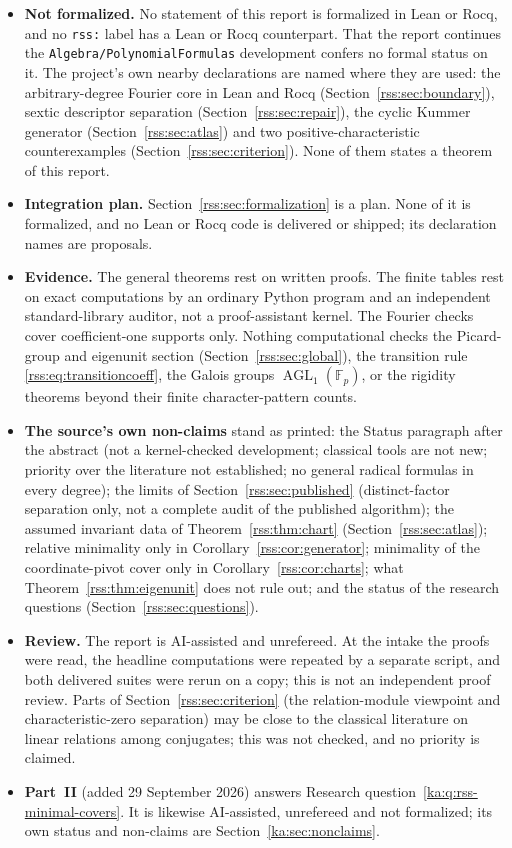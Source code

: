 \documentclass[11pt,a4paper]{article}
\theoremstyle{definition}
\theoremstyle{remark}
\newcommand{\F}{\mathbb F}
\newcommand{\AGL}{\operatorname{AGL}}
\newcommand{\code}[1]{{\small\nolinkurl{#1}}}
\begin{document}
\begin{itemize}
\item \textbf{Not formalized.} No statement of this report is formalized in
Lean or Rocq, and no \code{rss:} label has a Lean or Rocq counterpart. That
the report continues the \code{Algebra/PolynomialFormulas} development
confers no formal status on it. The project's own nearby declarations are named where they are used:
the arbitrary-degree Fourier core in Lean and Rocq (Section~\ref{rss:sec:boundary}),
sextic descriptor separation (Section~\ref{rss:sec:repair}), the cyclic Kummer
generator (Section~\ref{rss:sec:atlas}) and two positive-characteristic
counterexamples (Section~\ref{rss:sec:criterion}). None of them states a
theorem of this report.
\item \textbf{Integration plan.} Section~\ref{rss:sec:formalization} is a
plan. None of it is formalized, and no Lean or Rocq code is delivered or
shipped; its declaration names are proposals.
\item \textbf{Evidence.} The general theorems rest on written proofs. The
finite tables rest on exact computations by an ordinary Python program and an
independent standard-library auditor, not a proof-assistant kernel. The
Fourier checks cover coefficient-one supports only. Nothing computational
checks the Picard-group and eigenunit section (Section~\ref{rss:sec:global}),
the transition rule \eqref{rss:eq:transitioncoeff}, the Galois groups
$\AGL_1(\F_p)$, or the rigidity theorems beyond their finite character-pattern
counts.
\item \textbf{The source's own non-claims} stand as printed: the Status
paragraph after the abstract (not a kernel-checked development; classical
tools are not new; priority over the literature not established; no general
radical formulas in every degree); the limits of Section~\ref{rss:sec:published}
(distinct-factor separation only, not a complete audit of the published
algorithm); the assumed invariant data of Theorem~\ref{rss:thm:chart}
(Section~\ref{rss:sec:atlas}); relative minimality only in
Corollary~\ref{rss:cor:generator}; minimality of the coordinate-pivot cover
only in Corollary~\ref{rss:cor:charts}; what Theorem~\ref{rss:thm:eigenunit}
does not rule out; and the status of the research questions
(Section~\ref{rss:sec:questions}).
\item \textbf{Review.} The report is AI-assisted and unrefereed. At the intake
the proofs were read, the headline computations were repeated by a separate
script, and both delivered suites were rerun on a copy; this is not an
independent proof review. Parts of Section~\ref{rss:sec:criterion} (the
relation-module viewpoint and characteristic-zero separation) may be close
to the classical literature on linear relations among conjugates; this was
not checked, and no priority is claimed.
\item \textbf{Part~II} (added 29 September 2026) answers Research
question~\ref{ka:q:rss-minimal-covers}. It is likewise AI-assisted,
unrefereed and not formalized; its own status and non-claims are
Section~\ref{ka:sec:nonclaims}.
\end{itemize}
\end{document}

